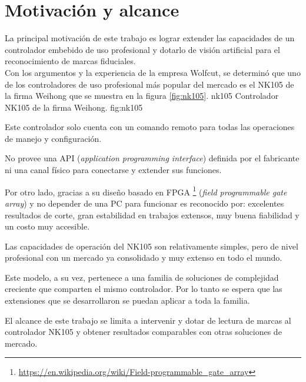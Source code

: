 \section{Motivación y alcance}
   La principal motivación de este trabajo es lograr extender las capacidades de un controlador embebido de uso profesional y dotarlo de visión artificial para el reconocimiento de marcas fiduciales. \\
   Con los argumentos y la experiencia de la empresa Wolfcut, se determinó que uno de los controladores de uso profesional más popular del mercado es el NK105 de la firma Weihong \citep{WEBSITE:nk105} que se muestra en la figura \ref{fig:nk105}.
      {nk105}
      {Controlador NK105 de la firma Weihong.}
      {fig:nk105}

   Este controlador solo cuenta con un comando remoto para todas las operaciones de manejo y configuración.\par
   No provee una API (\textit{application programming interface}) definida por el fabricante ni una canal físico para conectarse y extender sus funciones. \par
   Por otro lado, gracias a su diseño basado en FPGA \footnote{\url{https://en.wikipedia.org/wiki/Field-programmable_gate_array}} (\textit{field programmable gate array}) y no depender de una PC para funcionar es reconocido por: excelentes resultados de corte, gran estabilidad en trabajos extensos, muy buena fiabilidad y un costo muy accesible. \par
   Las capacidades de operación del NK105 son relativamente simples, pero de nivel profesional con un mercado ya consolidado y muy extenso en todo el mundo.\par
   Este modelo, a su vez, pertenece a una familia de soluciones de complejidad creciente que comparten el mismo controlador. Por lo tanto se espera que las extensiones que se desarrollaron se puedan aplicar a toda la familia.\par
   El alcance de este trabajo se limita a intervenir y dotar de lectura de marcas al controlador NK105 y obtener resultados comparables con otras soluciones de mercado.

